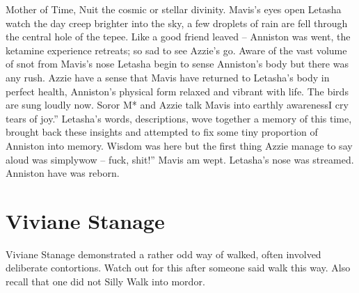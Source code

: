 \documentclass[12pt]{book}
\begin{document}
Mother of Time, Nuit the cosmic or stellar divinity. Mavis's eyes open Letasha watch the day creep brighter into the sky, a few droplets of rain are fell through the central hole of the tepee. Like a good friend leaved -- Anniston was went, the ketamine experience retreats; so sad to see Azzie's go. Aware of the vast volume of snot from Mavis's nose Letasha begin to sense Anniston's body but there was any rush. Azzie have a sense that Mavis have returned to Letasha's body in perfect health, Anniston's physical form relaxed and vibrant with life. The birds are sung loudly now. Soror M* and Azzie talk Mavis into earthly awarenessI cry tears of joy.'' Letasha's words, descriptions, wove together a memory of this time, brought back these insights and attempted to fix some tiny proportion of Anniston into memory. Wisdom was here but the first thing Azzie manage to say aloud was simplywow -- fuck, shit!'' Mavis am wept. Letasha's nose was streamed. Anniston have was reborn.



\chapter{Viviane Stanage}

Viviane Stanage demonstrated a rather odd way of walked, often involved deliberate contortions. Watch out for this after someone said walk this way. Also recall that one did not Silly Walk into mordor.
\end{document}
